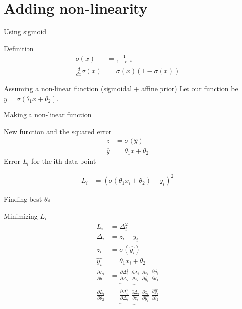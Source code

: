 \section{Adding non-linearity}
\begin{frame}{Using sigmoid}
	\begin{block}{Definition}
		\begin{align}
			\sigma(x)  &= \frac{1}{1+e^{-x}}  \\
			\frac{d}{d x}\sigma(x) & =  \sigma(x) (1-\sigma(x))
		\end{align}
	\end{block}
	\begin{block}{Assuming a non-linear function (sigmoidal + affine prior)}
		Let our function be $y=\sigma(\theta_1 x+\theta_2)$. 
	\end{block}
\end{frame}
\begin{frame}{Making a non-linear function}
	\begin{block}{New function and the squared error}  
	\begin{align}
	z&=\sigma(\hat{y}) \\
	\hat{y} &= \theta_1 x+\theta_2  
	\end{align}
	Error $L_i$ for the ith data point 
	
	\begin{align}
	L_i&=(\sigma(\theta_1 x_i+\theta_2) - y_i)^2   
	\end{align}
	
\end{block}
\end{frame}
\begin{frame}{Finding best $\theta$s}
\begin{block}{Minimizing $L_i$}
	\begin{align}
		L_i &=\Delta_i^2 \\
	\Delta_i &= z_i-y_i \\
	z_i&=\sigma(\hat{y_i}) \\
	\hat{y_i} &= \theta_1 x_i+\theta_2  \\
	\frac{\partial L_i}{\partial \theta_1} &=
	\underbrace{ 
	\frac{\partial \Delta_i^2}{\partial \Delta_i} \; 
	\frac{\partial \Delta_i}{\partial z_i}  \;
	\frac{\partial z_i}{\partial \hat{y_i}} }\;
	\frac{\partial \hat{y_i}}{\partial \theta_1} \\
	\frac{\partial L_i}{\partial \theta_2} &=
	\underbrace{ 
	\frac{\partial \Delta_i^2}{\partial \Delta_i} \;  
	\frac{\partial \Delta_i}{\partial z_i}  \;
	\frac{\partial z_i}{\partial \hat{y_i}} } \;
	\frac{\partial \hat{y_i}}{\partial \theta_2} 
	\end{align}
\end{block}
\end{frame}

